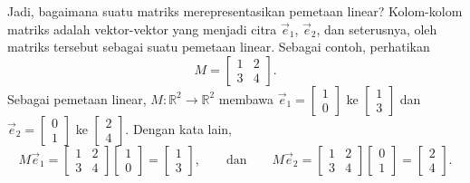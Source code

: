 Jadi, bagaimana suatu matriks merepresentasikan pemetaan linear?
Kolom-kolom matriks adalah vektor-vektor yang menjadi citra $\vec{e}_1$,
$\vec{e}_2$, dan seterusnya, oleh matriks tersebut sebagai suatu pemetaan
linear.
Sebagai contoh, perhatikan
\begin{equation*}
M =
\begin{bmatrix}
1 & 2 \\ 3 & 4
\end{bmatrix} .
\end{equation*}
Sebagai pemetaan linear, $M \colon {\mathbb R}^2 \to {\mathbb R}^2$ membawa
$\vec{e}_1 = \left[ \begin{smallmatrix} 1 \\ 0 \end{smallmatrix} \right]$ ke
$\left[ \begin{smallmatrix} 1 \\ 3 \end{smallmatrix} \right]$
dan
$\vec{e}_2 = \left[ \begin{smallmatrix} 0 \\ 1 \end{smallmatrix} \right]$ ke
$\left[ \begin{smallmatrix} 2 \\ 4 \end{smallmatrix} \right]$. Dengan kata
lain,
\begin{equation*}
M \vec{e}_1 =
\begin{bmatrix}
1 & 2 \\ 3 & 4
\end{bmatrix}
\begin{bmatrix}
1 \\ 0
\end{bmatrix}
=
\begin{bmatrix}
1 \\ 3
\end{bmatrix},
\qquad
\text{dan}
\qquad
M \vec{e}_2 =
\begin{bmatrix}
1 & 2 \\ 3 & 4
\end{bmatrix}
\begin{bmatrix}
0 \\ 1
\end{bmatrix}
=
\begin{bmatrix}
2 \\ 4
\end{bmatrix}.
\end{equation*}

